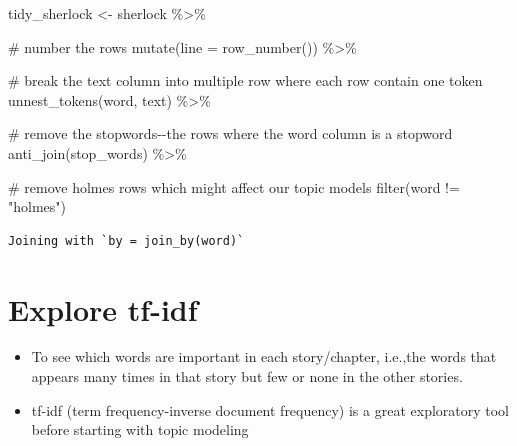 \documentclass[
  letterpaper,
  DIV=11,
  numbers=noendperiod]{scrreprt}
\newenvironment{Shaded}{\begin{snugshade}}{\end{snugshade}}
\newcommand{\AttributeTok}[1]{\textcolor[rgb]{0.40,0.45,0.13}{#1}}
\newcommand{\CommentTok}[1]{\textcolor[rgb]{0.37,0.37,0.37}{#1}}
\newcommand{\FunctionTok}[1]{\textcolor[rgb]{0.28,0.35,0.67}{#1}}
\newcommand{\NormalTok}[1]{\textcolor[rgb]{0.00,0.23,0.31}{#1}}
\newcommand{\OtherTok}[1]{\textcolor[rgb]{0.00,0.23,0.31}{#1}}
\newcommand{\SpecialCharTok}[1]{\textcolor[rgb]{0.37,0.37,0.37}{#1}}
\newcommand{\StringTok}[1]{\textcolor[rgb]{0.13,0.47,0.30}{#1}}
\providecommand{\tightlist}{%
  \setlength{\itemsep}{0pt}\setlength{\parskip}{0pt}}\usepackage{longtable,booktabs,array}
\begin{document}
\begin{Shaded}
\begin{Highlighting}[]
\NormalTok{tidy\_sherlock }\OtherTok{\textless{}{-}}\NormalTok{ sherlock }\SpecialCharTok{\%\textgreater{}\%}
  
  \CommentTok{\# number the rows}
  \FunctionTok{mutate}\NormalTok{(}\AttributeTok{line =} \FunctionTok{row\_number}\NormalTok{()) }\SpecialCharTok{\%\textgreater{}\%} 
  
  \CommentTok{\# break the text column into multiple row where each row contain one token}
  \FunctionTok{unnest\_tokens}\NormalTok{(word, text) }\SpecialCharTok{\%\textgreater{}\%} 
  
  \CommentTok{\# remove the stopwords{-}{-}the rows where the word column is a stopword}
  \FunctionTok{anti\_join}\NormalTok{(stop\_words) }\SpecialCharTok{\%\textgreater{}\%} 
  
  \CommentTok{\# remove holmes rows which might affect our topic models}
  \FunctionTok{filter}\NormalTok{(word }\SpecialCharTok{!=} \StringTok{"holmes"}\NormalTok{)}
\end{Highlighting}
\end{Shaded}

\begin{verbatim}
Joining with `by = join_by(word)`
\end{verbatim}

\section{Explore tf-idf}\label{explore-tf-idf}

\begin{itemize}
\tightlist
\item
  To see which words are important in each story/chapter, i.e.,the words
  that appears many times in that story but few or none in the other
  stories.
\item
  tf-idf (term frequency-inverse document frequency) is a great
  exploratory tool before starting with topic modeling
\end{itemize}
\end{document}
